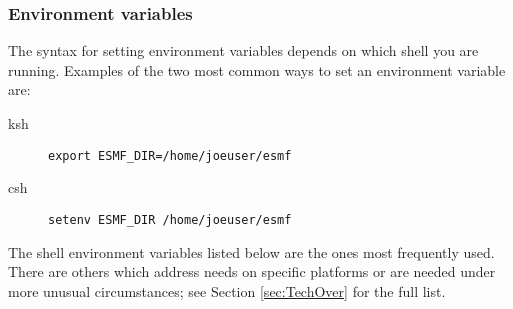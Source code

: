 \subsubsection{Environment variables}

The syntax for setting environment variables depends on which shell
you are running.  Examples of the two most common ways to set 
an environment variable are:
\begin{description}
\item[ksh] {\tt  export ESMF\_DIR=/home/joeuser/esmf}
\item[csh] {\tt  setenv ESMF\_DIR /home/joeuser/esmf}
\end{description}

The shell environment variables listed below are the ones most
frequently used.  There are others which address needs on specific
platforms or are needed under more unusual circumstances; 
see Section \ref{sec:TechOver} for the full list.  
